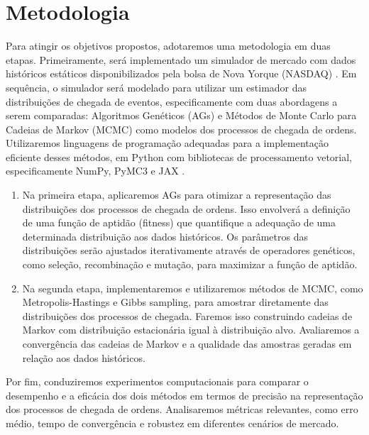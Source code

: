 \chapter{Metodologia}

Para atingir os objetivos propostos, adotaremos uma metodologia em duas etapas. Primeiramente, será implementado um simulador de mercado com dados históricos estáticos disponibilizados pela bolsa de Nova Yorque (NASDAQ) \citep{Nagy2023}. Em sequência, o simulador será modelado para utilizar um estimador das distribuições de chegada de eventos, especificamente com duas abordagens a serem comparadas: Algoritmos Genéticos (AGs) e Métodos de Monte Carlo para Cadeias de Markov (MCMC) como modelos dos processos de chegada de ordens. Utilizaremos linguagens de programação adequadas para a implementação eficiente desses métodos, em Python com bibliotecas de processamento vetorial, especificamente NumPy, PyMC3 e JAX \citep{Bradbury2018, Oriol2023}.

\begin{enumerate}
	\item Na primeira etapa, aplicaremos AGs para otimizar a representação das distribuições dos processos de chegada de ordens. Isso envolverá a definição de uma função de aptidão (fitness) que quantifique a adequação de uma determinada distribuição aos dados históricos. Os parâmetros das distribuições serão ajustados iterativamente através de operadores genéticos, como seleção, recombinação e mutação, para maximizar a função de aptidão.
	
	\item Na segunda etapa, implementaremos e utilizaremos métodos de MCMC, como Metropolis-Hastings e Gibbs sampling, para amostrar diretamente das distribuições dos processos de chegada. Faremos isso construindo cadeias de Markov com distribuição estacionária igual à distribuição alvo. Avaliaremos a convergência das cadeias de Markov e a qualidade das amostras geradas em relação aos dados históricos.
\end{enumerate}

Por fim, conduziremos experimentos computacionais para comparar o desempenho e a eficácia dos dois métodos em termos de precisão na representação dos processos de chegada de ordens. Analisaremos métricas relevantes, como erro médio, tempo de convergência e robustez em diferentes cenários de mercado.